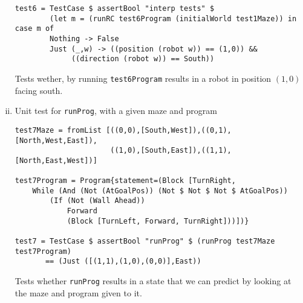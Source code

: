 \documentclass[a4paper,10pt]{article}
\begin{document}
\begin{enumerate}[i.]
\begin{verbatim}
test6 = TestCase $ assertBool "interp tests" $ 
        (let m = (runRC test6Program (initialWorld test1Maze)) in case m of
        Nothing -> False 
        Just (_,w) -> ((position (robot w)) == (1,0)) && 
             ((direction (robot w)) == South))
\end{verbatim}
Tests wether, by running \verb=test6Program= results in a robot in position $(1,0)$ facing south.

\item Unit test for \verb=runProg=, with a given maze and program
\begin{verbatim}
test7Maze = fromList [((0,0),[South,West]),((0,1),[North,West,East]),
                      ((1,0),[South,East]),((1,1),[North,East,West])]

test7Program = Program{statement=(Block [TurnRight,
    While (And (Not (AtGoalPos)) (Not $ Not $ Not $ AtGoalPos))
        (If (Not (Wall Ahead))
            Forward
            (Block [TurnLeft, Forward, TurnRight]))])} 

test7 = TestCase $ assertBool "runProg" $ (runProg test7Maze test7Program)
       == (Just ([(1,1),(1,0),(0,0)],East))
\end{verbatim}
Tests whether \verb=runProg= results in a state that we can predict by looking at the maze and program given to it.
\end{enumerate}
\end{document}
